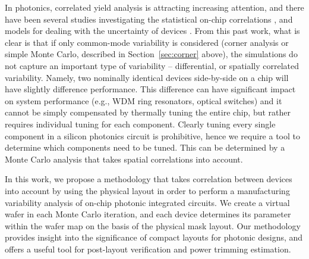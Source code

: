 \documentclass[journal]{spie}
\begin{document}
In photonics, correlated yield analysis is attracting increasing attention, and there have been several studies investigating the statistical on-chip correlations \cite{lukas14:OFC,hochberg:wafer}, and models for dealing with the uncertainty of devices \cite{MIT:uncertainty}.  From this past work, what is clear is that if only common-mode variability is considered (corner analysis or simple Monte Carlo, described in Section~\ref{sec:corner} above), the simulations do not capture an important type of variability -- differential, or spatially correlated variability.  Namely, two nominally identical devices side-by-side on a chip will have slightly difference performance.  This difference can have significant impact on system performance (e.g., WDM ring resonators, optical switches) and it cannot be simply compensated by thermally tuning the entire chip, but rather requires individual tuning for each component.  Clearly tuning every single component in a silicon photonics circuit is prohibitive, hence we require a tool to determine which components need to be tuned.  This can be determined by a Monte Carlo analysis that takes spatial correlations into account.

In this work, we propose a methodology that takes correlation between devices into account by using the physical layout in order to perform a manufacturing variability analysis of on-chip photonic integrated circuits.  We create a virtual wafer in each Monte Carlo iteration, and each device determines its parameter within the wafer map on the basis of the physical mask layout.
Our methodology  provides insight into the significance of compact layouts for photonic designs, and offers a useful tool for post-layout verification and power trimming estimation.
\end{document}
